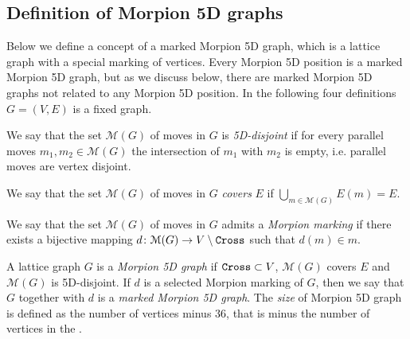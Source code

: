 
\subsection{Definition of Morpion 5D graphs}

Below we define a concept of a marked Morpion 5D graph, which is a lattice graph with a special marking of vertices. Every Morpion 5D position is a marked Morpion 5D graph, but as we discuss below, there are marked Morpion 5D graphs not related to any Morpion 5D position.
In the following 
four definitions  $G = (V, E)$ is a fixed graph. 

\begin{definition} 
We say that the set $\mathcal{M}(G)$ of moves in $G$ is \emph{5D-disjoint}
if for every parallel moves $m_1, m_2 \in \mathcal{M}(G)$ the intersection of $m_1$ with $m_2$ is empty, i.e. parallel moves are vertex disjoint.
\end{definition}

\begin{definition} 
We say that the set $\mathcal{M}(G)$ of moves in $G$ \emph{covers} $E$ if 
  $\bigcup_{m \in \mathcal{M}(G)} E(m) = E$.
\end{definition}

\begin{definition}
  We say that the set $\mathcal{M}(G)$ of moves in $G$ admits a \emph{Morpion marking} if
     there exists a bijective mapping $d \colon \mathcal{M}(G) \to V \setminus \texttt{Cross}$ such that $d(m) \in m$.
\end{definition}

\begin{definition}
  A lattice graph $G$ is a \emph{Morpion 5D graph} if $\texttt{Cross} \subset V$,
    $\mathcal{M}(G)$ covers $E$ and $\mathcal{M}(G)$ is 5D-disjoint.
  If $d$ is a selected Morpion marking of $G$, then we say that $G$ together with $d$ is 
    a \emph{marked Morpion 5D graph}.
  The \emph{size} of Morpion 5D graph  is defined as the number of vertices minus $36$, that is minus the number of vertices in the \Cross.
 \end{definition}


